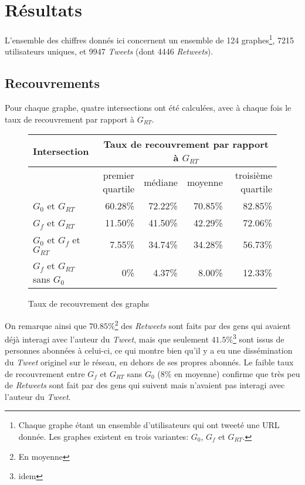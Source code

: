 \documentclass[]{article}
\begin{document}
\section{Résultats}

L'ensemble des chiffres donnés ici concernent un ensemble de 124
graphes\footnote{Chaque graphe étant un ensemble d'utilisateurs qui ont
 tweeté une URL donnée. Les graphes existent en trois variantes: $G_{0}$,
 $G_{f}$ et $G_{RT}$.}, 7215 utilisateurs uniques, et 9947 \emph{Tweets}
(dont 4446 \emph{Retweets}).

\subsection{Recouvrements}

Pour chaque graphe, quatre intersections ont été calculées, avec à chaque fois
le taux de recouvrement par rapport à $G_{RT}$.

\begin{figure}[!h]
\begin{center}
\begin{tabular}{|l|r|r|r|r|}
\hline
Intersection&\multicolumn{4}{c|}{Taux de recouvrement par rapport à $G_{RT}$}\\
\hline
&premier quartile&médiane&moyenne&troisième quartile\\
\hline
$G_0$ et $G_{RT}$ & 60.28\% & 72.22\% & 70.85\% & 82.85\%\\
\hline
$G_f$ et $G_{RT}$ & 11.50\% & 41.50\% & 42.29\% & 72.06\%\\
\hline
$G_0$ et $G_f$ et $G_{RT}$ & 7.55\% & 34.74\% & 34.28\% & 56.73\%\\
\hline
$G_f$ et $G_{RT}$ sans $G_0$ & 0\% & 4.37\% & 8.00\% & 12.33\%\\
\hline
\end{tabular}
\end{center}
\caption{Taux de recouvrement des graphs}
\end{figure}

On remarque ainsi que $70.85\%$\footnote{En moyenne} des \emph{Retweets} sont
faits par des gens qui avaient déjà interagi avec l'auteur du \emph{Tweet},
mais que seulement $41.5\%$\footnote{idem} sont issus de personnes abonnées
à celui-ci, ce qui montre bien qu'il y a eu une dissémination du \emph{Tweet}
originel sur le réseau, en dehors de ses propres abonnés. Le faible taux de
recouvrement entre $G_f$ et $G_{RT}$ sans $G_0$ ($8\%$ en moyenne) confirme que
très peu de \emph{Retweets} sont fait par des gens qui suivent mais n'avaient
pas interagi avec l'auteur du \emph{Tweet}.
\end{document}
